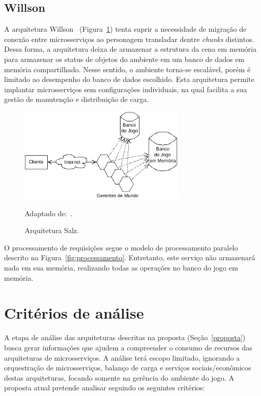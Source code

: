 \subsection{Willson}
\label{willson}



A arquitetura Willson~\cite{stephenclarkewillson2017} (Figura~\ref{fig:willson}) tenta suprir a necessidade de migração de conexão entre microsserviços ao personagem transladar dentre \textit{chunks} distintos.
%
Dessa forma, a arquitetura deixa de armazenar a estrutura da cena em memória para armazenar os status de objetos do ambiente em um banco de dados em memória compartilhado.
%
Nesse sentido, o ambiente torna-se escalável, porém é limitado ao desempenho do banco de dados escolhido.
%
Esta arquitetura permite implantar microsserviços sem configurações individuais, na qual facilita a sua gestão de manutenção e distribuição de carga.



\begin{figure}[htb!]
  \caption{Arquitetura Salz.}
  \label{fig:willson}
  \includegraphics[height=4.5cm]{img/cap3/willson.png}
  \centering

  Adaptado de:~\cite{albion_online_unite}.
\end{figure}



O processamento de requisições segue o modelo de processamento paralelo descrito na Figura~\ref{fig:processamento}.
%
Entretanto, este serviço não armazenará nada em sua memória, realizando todas as operações no banco do jogo em memória.



\section{Critérios de análise}
\label{analise}



A etapa de análise das arquiteturas descritas na proposta (Seção~\ref{proposta}) busca gerar informações que ajudem a compreender o consumo de recursos das arquiteturas de microsserviços.
%
A análise terá escopo limitado, ignorando a orquestração de microsserviços, balanço de carga e serviços sociais/econômicos destas arquiteturas, focando somente na gerência do ambiente do jogo.
%
A proposta atual pretende analisar seguindo os seguintes critérios:



